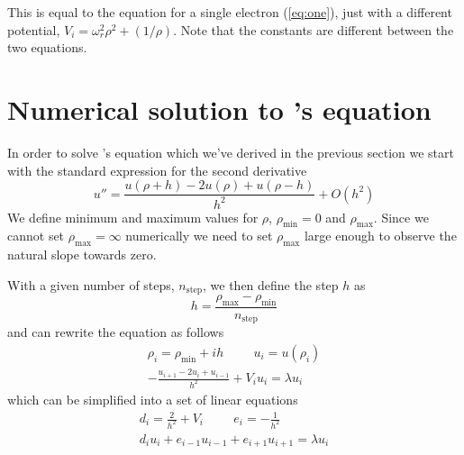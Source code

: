 \documentclass[a4paper]{revtex4}
\begin{document}
This is equal to the equation for a single electron (\ref{eq:one}), just with a
different potential, $V_i = \omega_r^2 \rho^2 + (1/\rho)$. Note that the
constants are different between the two equations.

\section{Numerical solution to \se's equation}

In order to solve \se's equation which we've derived in the previous section
we start with the standard expression for the second derivative
\begin{equation}
  u'' =
  \frac
    {u(\rho + h) - 2u(\rho) + u(\rho - h)}
    {h^2}
  + O(h^2)
\end{equation}
We define minimum and maximum values for $\rho$, $\rho_\text{min} = 0$ and
$\rho_\text{max}$. Since we cannot set $\rho_\text{max} = \infty$ numerically
we need to set $\rho_\text{max}$ large enough to observe the natural slope
towards zero.

With a given number of steps, $n_\text{step}$, we then define the step $h$ as
\begin{equation}
  h = \frac{\rho_\text{max} - \rho_\text{min}}{n_\text{step}}
\end{equation}
and can rewrite the \se{} equation as follows
\begin{gather}
  \rho_i = \rho_\text{min} + ih \hspace{1cm}
  u_i = u(\rho_i) \\
  -
  \frac{u_{i+1} - 2u_i + u_{i-1}}{h^2}
  + V_i u_i
  =
  \lambda u_i
\end{gather}
which can be simplified into a set of linear equations
\begin{align}
  d_i = \frac{2}{h^2} + V_i \hspace{1cm}
  e_i = - \frac{1}{h^2} \\
  d_i u_i + e_{i-1} u_{i-1} + e_{i+1} u_{i+1} = \lambda u_i
\end{align}
\end{document}
